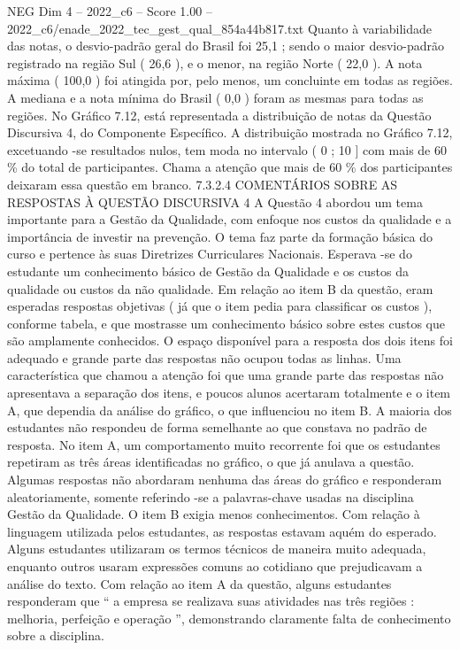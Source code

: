 \begin{textsample}{NEG Dim 4 – 2022\_c6 – Score 1.00 – 2022\_c6/enade\_2022\_tec\_gest\_qual\_854a44b817.txt}
Quanto à variabilidade das notas, o desvio-padrão geral do Brasil foi 25,1 ; sendo o maior desvio-padrão registrado na região Sul ( 26,6 ), e o menor, na região Norte ( 22,0 ).
A nota máxima ( 100,0 ) foi atingida por, pelo menos, um concluinte em todas as regiões.
A mediana e a nota mínima do Brasil ( 0,0 ) foram as mesmas para todas as regiões.
No Gráfico 7.12, está representada a distribuição de notas da Questão Discursiva 4, do Componente Específico.
A distribuição mostrada no Gráfico 7.12, excetuando -se resultados nulos, tem moda no intervalo ( 0 ; 10 ] com mais de 60 \% do total de participantes.
Chama a atenção que mais de 60 \% dos participantes deixaram essa questão em branco. 7.3.2.4 COMENTÁRIOS SOBRE AS RESPOSTAS À QUESTÃO DISCURSIVA 4 A Questão 4 abordou um tema importante para a Gestão da Qualidade, com enfoque nos custos da qualidade e a importância de investir na prevenção.
O tema faz parte da formação básica do curso e pertence às suas Diretrizes Curriculares Nacionais.
Esperava -se do estudante um conhecimento básico de Gestão da Qualidade e os custos da qualidade ou custos da não qualidade.
Em relação ao item B da questão, eram esperadas respostas objetivas ( já que o item pedia para classificar os custos ), conforme tabela, e que mostrasse um conhecimento básico sobre estes custos que são amplamente conhecidos.
O espaço disponível para a resposta dos dois itens foi adequado e grande parte das respostas não ocupou todas as linhas.
Uma característica que chamou a atenção foi que uma grande parte das respostas não apresentava a separação dos itens, e poucos alunos acertaram totalmente e o item A, que dependia da análise do gráfico, o que influenciou no item B.
A maioria dos estudantes não respondeu de forma semelhante ao que constava no padrão de resposta.
No item A, um comportamento muito recorrente foi que os estudantes repetiram as três áreas identificadas no gráfico, o que já anulava a questão.
Algumas respostas não abordaram nenhuma das áreas do gráfico e responderam aleatoriamente, somente referindo -se a palavras-chave usadas na disciplina Gestão da Qualidade.
O item B exigia menos conhecimentos.
Com relação à linguagem utilizada pelos estudantes, as respostas estavam aquém do esperado.
Alguns estudantes utilizaram os termos técnicos de maneira muito adequada, enquanto outros usaram expressões comuns ao cotidiano que prejudicavam a análise do texto.
Com relação ao item A da questão, alguns estudantes responderam que “ a empresa se realizava suas atividades nas três regiões : melhoria, perfeição e operação ”, demonstrando claramente falta de conhecimento sobre a disciplina.

\end{textsample}
